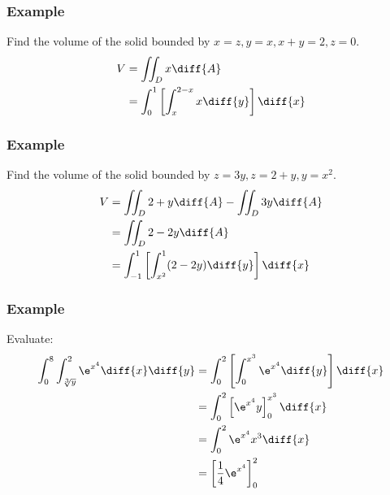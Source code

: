 \documentclass[letterpaper, 12pt]{math}
\begin{document}
\subsubsection*{Example}
Find the volume of the solid bounded by \( x = z, y = x, x+y = 2, z = 0 \).
\begin{align*}
  V &= \iint_{D}x\diff{A} \\
  &= \int_{0}^{1}\left[\int_{x}^{2-x}x\diff{y}\right]\diff{x} \\
\end{align*}

\subsubsection*{Example}
Find the volume of the solid bounded by \( z = 3y, z = 2+y, y = x^2 \).
\begin{align*}
  V &= \iint_{D}2+y\diff{A}-\iint_{D}3y\diff{A} \\
  &= \iint_{D}2-2y\diff{A} \\
  &= \int_{-1}^{1}\left[\int_{x^2}^{1}(2-2y)\diff{y}\right]\diff{x}
\end{align*}

\subsubsection*{Example}
Evaluate:
\begin{align*}
  \int_{0}^{8}\int_{\sqrt[3]{y}}^{2}\e^{x^4}\diff{x}\diff{y} &=
    \int_{0}^{2}\left[\int_{0}^{x^3}\e^{x^4}\diff{y}\right]\diff{x} \\
  &= \int_{0}^{2}\left[\e^{x^4}y\right]_{0}^{x^3}\diff{x} \\
  &= \int_{0}^{2}\e^{x^4}x^3\diff{x} \\
  &= \left[\frac{1}{4}\e^{x^4}\right]_{0}^{2}
\end{align*}
\end{document}
